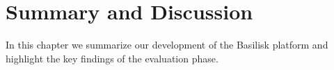 \chapter{Summary and Discussion}
\label{ch:summary}

In this chapter we summarize our development of the Basilisk platform and highlight the key findings of the evaluation phase.





